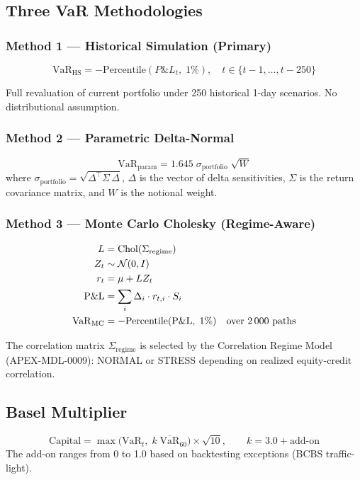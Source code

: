 \documentclass{apex_mdd}
\begin{document}
\subsection{Three VaR Methodologies}

\subsubsection{Method 1 — Historical Simulation (Primary)}
\begin{formulabox}
\[
  \mathrm{VaR}_{\mathrm{HS}} = -\mathrm{Percentile}(P\&L_t,\;1\%),\quad t \in \{t-1,\ldots,t-250\}
\]
\end{formulabox}
Full revaluation of current portfolio under 250 historical 1-day scenarios. No distributional assumption.

\subsubsection{Method 2 — Parametric Delta-Normal}
\begin{formulabox}
\[
  \mathrm{VaR}_{\mathrm{param}} = 1.645\;\sigma_{\mathrm{portfolio}}\;\sqrt{W}
\]
where $\sigma_{\mathrm{portfolio}} = \sqrt{\Delta^\top \Sigma\, \Delta}$, $\Delta$ is the vector of delta sensitivities, $\Sigma$ is the return covariance matrix, and $W$ is the notional weight.
\end{formulabox}

\subsubsection{Method 3 — Monte Carlo Cholesky (Regime-Aware)}
\begin{formulabox}
\begin{align*}
  L &= \mathrm{Chol}(\Sigma_{\mathrm{regime}})\\
  Z_t &\sim \mathcal{N}(0,I)\\
  r_t &= \mu + L Z_t\\
  \mathrm{P\&L} &= \sum_i \Delta_i \cdot r_{t,i} \cdot S_i\\
  \mathrm{VaR}_{\mathrm{MC}} &= -\mathrm{Percentile}(\mathrm{P\&L},\;1\%)\quad \text{over 2\,000 paths}
\end{align*}
\end{formulabox}
The correlation matrix $\Sigma_{\mathrm{regime}}$ is selected by the Correlation Regime Model (APEX-MDL-0009): NORMAL or STRESS depending on realized equity-credit correlation.

\subsection{Basel Multiplier}
\begin{formulabox}
\[
  \mathrm{Capital} = \max\!\bigl(\mathrm{VaR}_t,\;k\;\overline{\mathrm{VaR}}_{60}\bigr) \times \sqrt{10},
  \qquad k = 3.0 + \text{add-on}
\]
The add-on ranges from 0 to 1.0 based on backtesting exceptions (BCBS traffic-light).
\end{formulabox}
\end{document}
